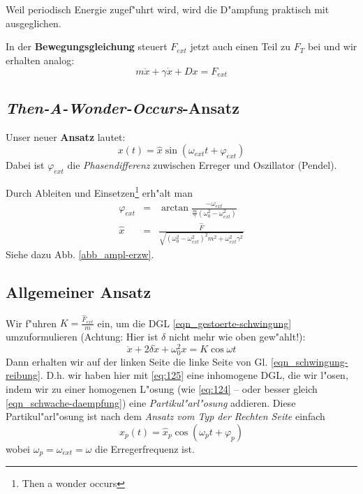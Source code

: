 Weil periodisch Energie zugef"uhrt wird, wird die D"ampfung praktisch
mit ausgeglichen.

In der \textbf{Bewegungsgleichung} steuert $F_{ext}$ jetzt auch einen Teil
zu $F_T$ bei und wir erhalten analog:
\begin{equation}
   \label{eqn_gestoerte-schwingung}
\boxed{   m\ddot x + \gamma \dot x + Dx = F_{ext} }
\end{equation}




\subsection{\emph{Then-A-Wonder-Occurs}-Ansatz}
\label{kap_then-a-wonder-occurs-ansatz}


Unser neuer \textbf{Ansatz} lautet:
\begin{equation}
   \label{eq:117}
   x(t) = \hat x \sin(\omega_{ext} t + \varphi_{ext})
\end{equation}
Dabei ist $\varphi_{ext}$ die \emph{Phasendifferenz} zuwischen Erreger
und Oszillator (Pendel).

Durch Ableiten und Einsetzen\footnote{Then a wonder occurs} erh"alt man
\begin{eqnarray}
   \label{eq:118}
   \varphi_{ext} &=& \arctan \frac{- \omega_{ext}}{\frac{m}{\gamma}
     (\omega_0^2 - \omega_{ext}^2)}\\
\hat x &=& \frac{\hat F}{\sqrt{(\omega_0^2 - \omega_{ext}^2)^2m^2 +
    {\omega_{ext}^2 \gamma^2}}}
\end{eqnarray}
Siehe dazu Abb. \ref{abb_ampl-erzw}.





\subsection{Allgemeiner Ansatz}
\label{kap_allgemeiner-ansatz-1}


Wir f"uhren $K = \frac{\hat F_{ext}}{m}$ ein, um die DGL
\eqref{eqn_gestoerte-schwingung} umzuformulieren (Achtung: Hier ist
$\delta$ nicht mehr wie oben gew"ahlt!):
\begin{equation}
   \label{eq:125}
   \ddot x + 2 \delta \dot x + \omega_0^2x = K \cos \omega t
\end{equation}
Dann erhalten wir auf der linken Seite die linke Seite von
Gl. \eqref{eqn_schwingung-reibung}. D.h. wir haben hier mit
\eqref{eq:125} eine inhomogene DGL, die wir l"osen, indem wir zu einer
homogenen L"osung (wie \eqref{eq:124} -- oder besser gleich \eqref{eqn_schwache-daempfung}) eine
\emph{Partikul"arl"osung} addieren. Diese
Partikul"arl"osung ist nach dem \emph{Ansatz vom Typ der Rechten Seite}
einfach 
\begin{equation}
   \label{eq:129}
   x_p(t) = \hat x_p \cos (\omega_p t + \varphi_p)
\end{equation}
wobei $\omega_p = \omega_{ext} = \omega$ die Erregerfrequenz ist.

